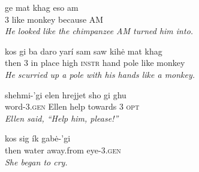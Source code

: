 \documentclass{article}[10pt]
\begin{document}
\begin{exe}
\ex
\gll ge mat khag eso am\\
3 like monkey because AM\\
\trans \emph{He looked like the chimpanzee AM turned him into.}

\ex
\gll kos gi ba daro yar\'{i} sam saw kih\.{e} mat khag\\
then 3 in place high \textsc{instr} hand pole like monkey\\
\trans \emph{He scurried up a pole with his hands like a monkey.}

\ex
\gll shehmi-'gi elen hrejjet sho gi ghu\\
word-3.\textsc{gen} Ellen help towards 3 \textsc{opt}\\
\trans \emph{Ellen said, ``Help him, please!''}

\ex
\gll kos sig \'{i}k gab\.{e}-'gi\\
then water away.from eye-3.\textsc{gen}\\
\trans \emph{She began to cry.}

\end{exe}
\end{document}

